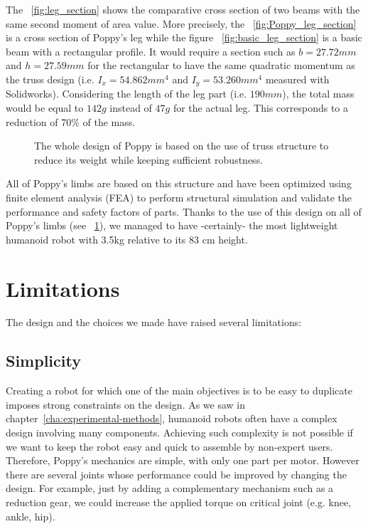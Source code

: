 The \figurename~\ref{fig:leg_section} shows the comparative cross section of two beams with the same second moment of area value. More precisely, the \figurename~\ref{fig:Poppy_leg_section} is a cross section of Poppy's leg while the figure \figurename~\ref{fig:basic_leg_section} is a basic beam with a rectangular profile.
It would require a section such as $b=27.72 mm$ and $h=27.59 mm$ for the rectangular to have the same quadratic momentum as the truss design (i.e. $I_x = 54.862 mm^4$ and $I_y = 53.260 mm^4$ measured with Solidworks).
Considering the length of the leg part (i.e. $190 mm$), the total mass would be equal to $142 g$ instead of $47 g$ for the actual leg. This corresponds to a reduction of 70\% of the mass.

\begin{figure}[!tb]
\centering


    \caption{The whole design of Poppy is based on the use of truss structure to reduce its weight while keeping sufficient robustness.}
    \label{fig:poppy_truss_structure}
\end{figure}

All of Poppy’s limbs are based on this structure and have been optimized using finite element analysis (FEA) to perform structural simulation and validate the performance and safety factors of parts.
Thanks to the use of this design on all of Poppy's limbs (see \figurename~\ref{fig:poppy_truss_structure}), we managed to have -certainly- the most lightweight humanoid robot with 3.5kg relative to its 83 cm height.

\clearpage





\section{Limitations} %

The design and the choices we made have raised several limitations:

\subsection{Simplicity} %
Creating a robot  for which one of the main objectives is to be easy to duplicate imposes strong constraints on the design. As we saw in chapter~\ref{cha:experimental-methods}, humanoid robots often have a complex design involving many components. Achieving such complexity is not possible if we want to keep the robot easy and quick to assemble by non-expert users. Therefore, Poppy's mechanics are simple, with only one part per motor. However there are several joints whose performance could be improved by changing the design. For example, just by adding a complementary mechanism such as a reduction gear, we could increase the applied torque on critical joint (e.g. knee, ankle, hip).

